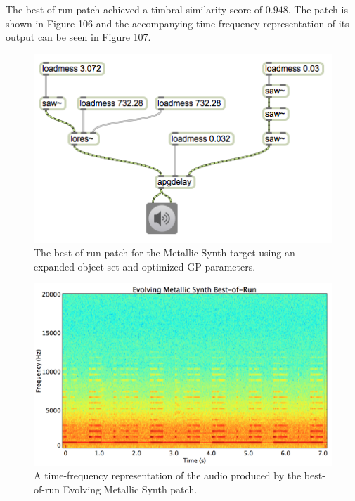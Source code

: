 \documentclass[12pt]{report} 	%
\numberwithin{figure}{chapter}
\numberwithin{table}{chapter}
\numberwithin{equation}{chapter}
\begin{document}
\begin{flushleft}
The best-of-run patch achieved a timbral similarity score of $0.948$. The patch is shown in Figure 106 and the accompanying time-frequency representation of its output can be seen in Figure 107.
\begin{figure}[h!]
\begin{center}
\includegraphics[width=\linewidth]{MetallicSynth_Best}
\caption[Metallic synth best-of-run patch]{The best-of-run patch for the Metallic Synth target using an expanded object set and optimized GP parameters.}
\end{center}
\end{figure}
\begin{figure}[h!]
\begin{center}
\includegraphics[scale=0.35,width=\linewidth]{EvolvingMetallicSynthBestOfRun}
\caption[Best-of-run evolving metallic synth time-frequency representation]{A time-frequency representation of the audio produced by the best-of-run Evolving Metallic Synth patch.}
\end{center}

\end{figure}
\end{flushleft}
\end{document}
